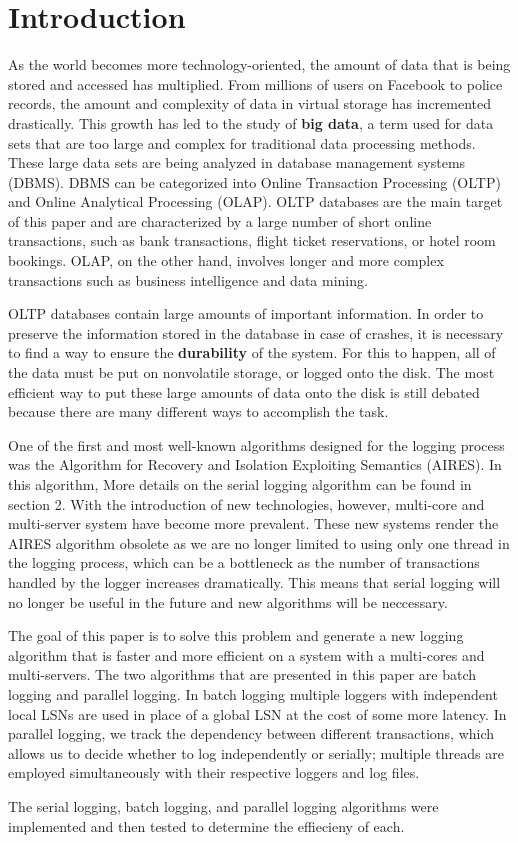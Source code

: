 \section{Introduction}

As the world becomes more technology-oriented, the amount of data that is being stored and accessed has multiplied. From millions of users on Facebook to police records, the amount and complexity of data in virtual storage has incremented drastically. This growth has led to the study of \textbf{big data}, a term used for data sets that are too large and complex for traditional data processing methods. These large data sets are being analyzed in database management systems (DBMS). DBMS can be categorized into Online Transaction Processing (OLTP) and Online Analytical Processing (OLAP). OLTP databases are the main target of this paper and are characterized by a large number of short online transactions, such as bank transactions, flight ticket reservations, or hotel room bookings. OLAP, on the other hand, involves longer and more complex transactions such as business intelligence and data mining. \newline

OLTP databases contain large amounts of important information. In order to preserve the information stored in the database in case of crashes, it is necessary to find a way to ensure the \textbf{durability} of the system. For this to happen, all of the data must be put on nonvolatile storage, or logged onto the disk. The most efficient way to put these large amounts of data onto the disk is still debated because there are many different ways to accomplish the task. \newline

One of the first and most well-known algorithms designed for the logging process was the Algorithm for Recovery and Isolation Exploiting Semantics (AIRES). In this algorithm, 
More details on the serial logging algorithm can be found in section 2. With the introduction of new technologies, however, multi-core and multi-server system have become more prevalent. These new systems render the AIRES algorithm obsolete as we are no longer limited to using only one thread in the logging process, which can be a bottleneck as the number of transactions handled by the logger increases dramatically. This means that serial logging will no longer be useful in the future and new algorithms will be neccessary.  \newline

The goal of this paper is to solve this problem and generate a new logging algorithm that is faster and more efficient on a system with a multi-cores and multi-servers. The two algorithms that are presented in this paper are batch logging and parallel logging. In batch logging multiple loggers with independent local LSNs are used in place of a global LSN at the cost of some more latency. In parallel logging, we track the dependency between different transactions, which allows us to decide whether to log  independently or serially; multiple threads are employed simultaneously with their respective loggers and log files. \newline

The serial logging, batch logging, and parallel logging algorithms were implemented and then tested to determine the effiecieny of each. 


  
